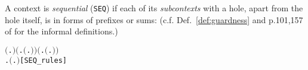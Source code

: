 A context is \emph{sequential} (\texttt{SEQ}) if each of its \emph{subcontexts} with
a hole, apart from the hole itself, is in forms of prefixes or sums:
(c.f. Def.~\ref{def:guardness} and p.101,157 of \cite{Mil89} for
the informal definitions.)
 \begin{alltt}
\HOLTokenTurnstile{}  \ensuremath{(}\HOLTokenLambda{}. \ensuremath{)} \HOLSymConst{\HOLTokenConj{}} \ensuremath{(}\HOLSymConst{\HOLTokenForall{}}.  \ensuremath{(}\HOLTokenLambda{}. \ensuremath{)}\ensuremath{)} \HOLSymConst{\HOLTokenConj{}} \ensuremath{(}\HOLSymConst{\HOLTokenForall{}} .   \HOLSymConst{\HOLTokenImp{}}  \ensuremath{(}\HOLTokenLambda{}. \HOLSymConst{\ensuremath{\ldotp}} \ensuremath{)}\ensuremath{)} \HOLSymConst{\HOLTokenConj{}}
   \HOLSymConst{\HOLTokenForall{}} .   \HOLSymConst{\HOLTokenConj{}}   \HOLSymConst{\HOLTokenImp{}}  \ensuremath{(}\HOLTokenLambda{}.   \HOLSymConst{\ensuremath{+}}  \ensuremath{)}\hfill{[SEQ_rules]}
\end{alltt}

